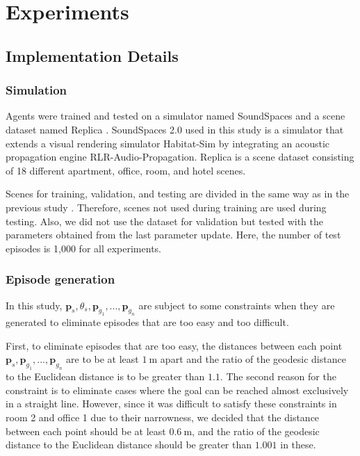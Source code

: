 \section{Experiments}

\subsection{Implementation Details}

\subsubsection{Simulation}
Agents were trained and tested on a simulator named SoundSpaces \cite{chen2020soundspaces, chen2022soundspaces} and a scene dataset named Replica \cite{straub2019replica}.
SoundSpaces 2.0 \cite{chen2022soundspaces} used in this study is a simulator that extends a visual rendering simulator Habitat-Sim \cite{savva2019habitat} by integrating an acoustic propagation engine RLR-Audio-Propagation. 
Replica is a scene dataset consisting of 18 different apartment, office, room, and hotel scenes.

Scenes for training, validation, and testing are divided in the same way as in the previous study \cite{chen2020soundspaces}.
Therefore, scenes not used during training are used during testing.
Also, we did not use the dataset for validation but tested with the parameters obtained from the last parameter update.
Here, the number of test episodes is 1,000 for all experiments.


\subsubsection{Episode generation}

In this study, $\boldsymbol{p}_s, \theta_s, \boldsymbol{p}_{g_1}, ... , \boldsymbol{p}_{g_n}$ are subject to some constraints when they are generated to eliminate episodes that are too easy and too difficult.

First, to eliminate episodes that are too easy, the distances between each point $\boldsymbol{p}_s, \boldsymbol{p}_{g_1}, ..., \boldsymbol{p}_{g_n}$ are to be at least $1\ \mathrm{m}$ apart and the ratio of the geodesic distance to the Euclidean distance is to be greater than $1.1$.
The second reason for the constraint is to eliminate cases where the goal can be reached almost exclusively in a straight line.
However, since it was difficult to satisfy these constraints in room 2 and office 1 due to their narrowness, we decided that the distance between each point should be at least $0.6\ \mathrm{m}$, and the ratio of the geodesic distance to the Euclidean distance should be greater than $1.001$ in these.


